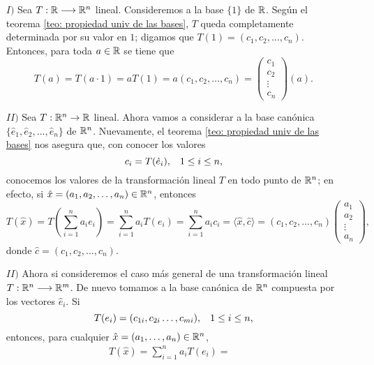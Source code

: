 \begin{itemize}
	\item[$I)$] Sea $T : \mathbb{R} \longrightarrow \mathbb{R}^{n}$ lineal.
	Consideremos a la base $\{ 1 \}$ de $\mathbb{R}$. Según el teorema 
	\ref{teo: propiedad univ de las bases},
	$T$ queda completamente determinada por su valor en $1$;
	digamos que $T(1) = (c_{1}, c_{2}, \ldots , c_{n})$.
	Entonces, para toda $a \in \mathbb{R}$ se tiene que 
	\[
	T(a) = T(a \cdot 1) = a T(1) = a(c_{1}, c_{2}, \ldots, c_{n})
	= \begin{pmatrix}
	c_{1} \\ c_{2} \\ \vdots \\ c_{n} 
	\end{pmatrix}
	(a).
	\]
	
	\item[$II)$] Sea $T: \mathbb{R}^{n} \rightarrow \mathbb{R}$ lineal. Ahora vamos
	a considerar a la base canónica 
	$\{ \hat{e}_{1}, \hat{e}_{2}, \ldots , \hat{e}_{n} \}$
	de $\mathbb{R}^{n}$. Nuevamente, el teorema \ref{teo: propiedad univ de las bases}
	nos asegura que,
	con conocer los valores
	\begin{equation*}
		\label{eq: 0, 9 oct}
		c_{i} = T(\hat{e}_{i}), \hspace{0.3cm} 1 \leq i \leq n,
	\end{equation*}
	conocemos los valores de la transformación lineal $T$ en todo 
	punto de $\mathbb{R}^{n}$; en efecto,
	si $\hat{x} = (a_{1}, a_{2}, \ldots , a_{n}) \in \mathbb{R}^{n}$, entonces
	\[
	T(\hat{x}) = T\left( \sum_{i=1}^{n} a_{i}e_{i} \right)
	= \sum_{i=1}^{n} a_{i} T(e_{i}) = 
	\sum_{i=1}^{n} a_{i}c_{i} = \langle \hat{x}, \hat{c} \rangle
	= (c_{1}, c_{2}, \ldots, c_{n}) \begin{pmatrix}
	a_{1} \\ a_{2} \\ \vdots \\ a_{n}
	\end{pmatrix},
	\]
	donde $\hat{c} = (c_{1}, c_{2}, \ldots ,c_{n})$.
	\item[$II)$] Ahora si consideremos el caso más general de 
	una transformación lineal $T: \mathbb{R}^{n} \longrightarrow \mathbb{R}^{m}$.
	De nuevo tomamos a la base canónica de $\mathbb{R}^{n}$ compuesta
	por los vectores $\hat{e}_{i}$. Si 
	\[
	T(e_{i}) = (c_{1i}, c_{2i} \ldots , c_{mi}),
	\hspace{0.3cm} 1 \leq i \leq n,
	\]
	entonces,
	para cualquier $\hat{x} = (a_{1}, \ldots , a_{n}) \in \mathbb{R}^{n}$,
	\begin{align*}
	T(\hat{x}) = \sum_{i=1}^{n} a_{i} T(e_{i}) = &

\end{align*}
\end{itemize}
